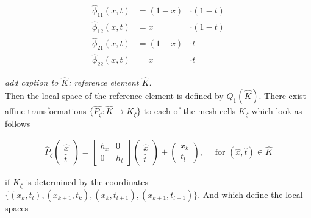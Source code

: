 \documentclass[../draft_1.tex]{subfiles}
\begin{document}
\begin{minipage}[l]{0.5\linewidth}

\end{minipage}%
\begin{minipage}[r]{0.5\linewidth}
\begin{ceqn}
	\begin{equation}
	\begin{aligned}
	\label{basis_function}
	\hat{\phi}_{11}(x,t) &= (1- x) &\cdot (1-t) \\
	\hat{\phi}_{12}(x,t) &=  x  &\cdot  (1-t) \\
	\hat{\phi}_{21}(x,t) &= (1- x) &\cdot t  \\
	\hat{\phi}_{22}(x,t) &= x  &\cdot  t 
	\end{aligned}
	\end{equation}
	\end{ceqn}
\end{minipage}
\textit{add caption to $\hat{K}$: reference element $\hat{K}$.} \\
Then the local space of the reference element is defined by $Q_1(\hat{K})$. There exist affine transformations $\{ \hat{P_{\zeta}}: \hat{K} \rightarrow K_{\zeta}\} $ to each of the mesh cells $K_{\zeta}$ which look as follows
\begin{ceqn}
	\begin{equation}
	\begin{aligned}
	\hat{P}_{\zeta} \begin{pmatrix}
	\hat{x} \\
	\hat{t}
	\end{pmatrix}= \begin{bmatrix}
	h_x & 0 \\
	0 & h_t
	\end{bmatrix}
	\begin{pmatrix}
	\hat{x} \\
	\hat{t}
	\end{pmatrix} + 	\begin{pmatrix}
	x_k \\
	t_l
	\end{pmatrix} , \quad \text{ for } (\hat{x}, \hat{t}) \in \hat{K}
	\end{aligned}
	\end{equation}
\end{ceqn}
if $K_{\zeta}$ is determined by the coordinates $\{(x_k, t_l), (x_{k+1}, t_k), (x_k, t_{l+1}), (x_{k+1}, t_{l+1})\}$. And which define the local spaces 
\end{document}
